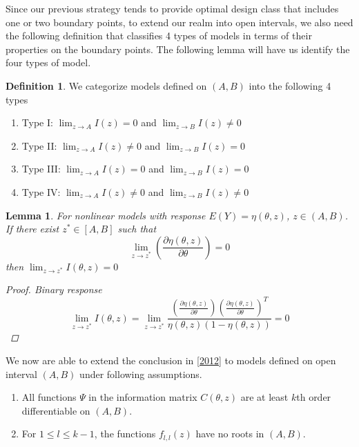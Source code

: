 \documentclass[11pt]{amsart}
\newtheorem{lemma}[theorem]{Lemma}
\theoremstyle{definition}
\newtheorem{definition}{Definition}[section]
\theoremstyle{remark}
\begin{document}
Since our previous strategy tends to provide optimal design class that includes one or two boundary points, to extend our realm into open intervals, we also need the following definition that classifies 4 types of models in terms of their properties on the boundary points. The following lemma will have us identify the four types of model.
\begin{definition} We categorize models defined on $(A,B)$ into the following 4 types\begin{enumerate}
    \item Type I: $\lim_{z\to A}I(z)=0$ and $\lim_{z\to B}I(z)\ne 0$
    \item Type II: $\lim_{z\to A}I(z)\ne 0$ and $\lim_{z\to B}I(z)=0$
    \item Type III: $\lim_{z\to A}I(z)= 0$ and $\lim_{z\to B}I(z)=0$
    \item Type IV: $\lim_{z\to A}I(z)\ne 0$ and $\lim_{z\to B}I(z)\ne0$
\end{enumerate}
\end{definition}

\begin{lemma} For nonlinear models with response $E(Y) = \eta(\theta,z)$, $z\in (A,B)$. If there exist $z^*\in [A,B]$ such that \[\lim_{z\to z^*}(\frac{\partial\eta(\theta,z)}{\partial \theta}) = 0\]
then $\lim_{z\to z^*}I(\theta,z)=0$
\begin{proof}
Binary response
\[\lim_{z\to z^*}I(\theta,z) = \lim_{z\to z^*}\frac{(\frac{\partial\eta(\theta,z)}{\partial \theta})(\frac{\partial\eta(\theta,z)}{\partial \theta})^T}{\eta(\theta,z)(1-\eta(\theta,z))} = 0\]


 \end{proof}
 \end{lemma}

We now are able to extend the conclusion in \ref{2012} to models defined on open interval $(A,B)$ under following assumptions. \begin{enumerate}
\item All functions $\Psi$ in the information matrix $C(\theta,z)$ are at least $k$th order differentiable on $(A,B)$.
\item For $1\le l\le k-1$, the functions $f_{l,l}(z)$ have no roots in $(A,B)$.
\end{enumerate} 
\end{document}

